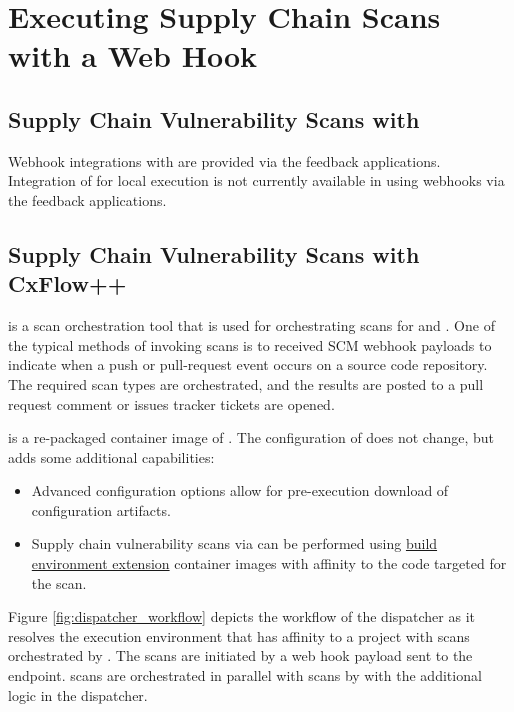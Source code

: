 \chapter{Executing Supply Chain Scans with a Web Hook}\label{chap:build_env_affinity}


\section{Supply Chain Vulnerability Scans with \cxone}

Webhook integrations with \cxone are provided via the feedback applications.
Integration of \scaresolver for local execution is not currently available in
\cxone using webhooks via the feedback applications.  


\section{Supply Chain Vulnerability Scans with CxFlow++}

\cxflow is a scan orchestration tool that is used for orchestrating scans for \cxsast and \cxsca.  One
of the typical methods of invoking scans is to received SCM webhook payloads to indicate when
a push or pull-request event occurs on a source code repository.  The required scan types are orchestrated,
and the results are posted to a pull request comment or issues tracker tickets are opened.

\cxflowplusplus is a re-packaged container image of \cxflow.  The configuration of \cxflow
does not change, but \cxflowplusplus adds some additional capabilities:

\begin{itemize}
    \item Advanced configuration options allow for pre-execution download of \cxflow configuration
    artifacts.
    \item Supply chain vulnerability scans via \scaresolver can be performed using
    \hyperref[sec:extending_environment]{build environment extension} container images with 
    affinity to the code targeted for the scan.
\end{itemize}

Figure \ref{fig:dispatcher_workflow} depicts the workflow of the dispatcher as it resolves
the \scaresolver execution environment that has affinity to a project with scans
orchestrated by \cxflowplusplus.  The scans are initiated by a web hook payload sent to the
\cxflowplusplus endpoint.  \cxsast scans are orchestrated in parallel with \cxsca scans by
\cxflowplusplus with the additional logic in the dispatcher.

